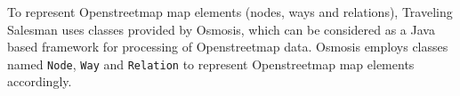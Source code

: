 To represent Openstreetmap map elements (nodes, ways and relations), Traveling Salesman uses classes provided by Osmosis, which can be considered as a Java based framework for processing of Openstreetmap data. Osmosis employs classes named \texttt{Node}, \texttt{Way} and \texttt{Relation} to represent Openstreetmap map elements accordingly. 